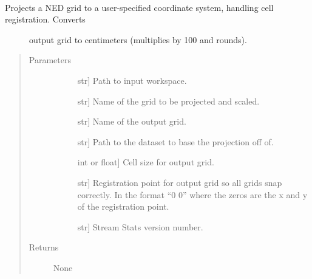 \documentclass[letterpaper,10pt,english]{sphinxmanual}
\begin{document}

\begin{fulllineitems}
\label{\detokenize{elevationTools:elevationTools.projScale}}~\begin{description}
\item[{Projects a NED grid to a user-specified coordinate system, handling cell registration. Converts}] \leavevmode
output grid to centimeters (multiplies by 100 and rounds).

\end{description}
\begin{quote}\begin{description}
\item[{Parameters}] \leavevmode\begin{description}
\item[{}] \leavevmode{[}str{]}
Path to input workspace.

\item[{}] \leavevmode{[}str{]}
Name of the grid to be projected and scaled.

\item[{}] \leavevmode{[}str{]}
Name of the output grid.

\item[{}] \leavevmode{[}str{]}
Path to the dataset to base the projection off of.

\item[{}] \leavevmode{[}int or float{]}
Cell size for output grid.

\item[{}] \leavevmode{[}str{]}
Registration point for output grid so all grids snap correctly. In the format “0 0” where the zeros are the x and y of the registration point.

\item[{}] \leavevmode{[}str{]}
Stream Stats version number.

\end{description}

\item[{Returns}] \leavevmode\begin{description}
\item[{None}] \leavevmode
\end{description}

\end{description}\end{quote}

\end{fulllineitems}
\end{document}
